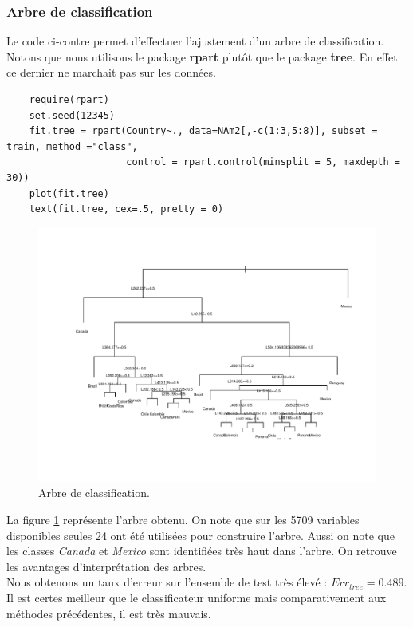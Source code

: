 \documentclass[12pt,a4paper]{article}
\begin{document}
\subsubsection{Arbre de classification}
Le code ci-contre permet d'effectuer l'ajustement d'un arbre de classification. Notons que nous utilisons le package \textbf{rpart} plutôt que le package \textbf{tree}. En effet ce dernier ne marchait pas sur les données.\vspace{2mm}
\begin{lstlisting}
	require(rpart)
	set.seed(12345)
	fit.tree = rpart(Country~., data=NAm2[,-c(1:3,5:8)], subset = train, method ="class",
	                 control = rpart.control(minsplit = 5, maxdepth = 30))
	plot(fit.tree)
	text(fit.tree, cex=.5, pretty = 0)
\end{lstlisting}
\begin{figure}[h!]
	\begin{center}
		\includegraphics[scale=0.8]{figures/tree.pdf}
		\caption{Arbre de classification.}
		\label{fig:tree}
	\end{center}
\end{figure}
La figure \ref{fig:tree} représente l'arbre obtenu. On note que sur les 5709 variables disponibles seules 24 ont été utilisées pour construire l'arbre. Aussi on note que les classes \textit{Canada} et \textit{Mexico} sont identifiées très haut dans l'arbre. On retrouve les avantages d'interprétation des arbres.\\
Nous obtenons un taux d'erreur sur l'ensemble de test très élevé : \hspace{5mm}$Err_{tree} = 0.489$. Il est certes meilleur que le classificateur uniforme mais comparativement aux méthodes précédentes, il est très mauvais. \vspace{2mm}
\end{document}
